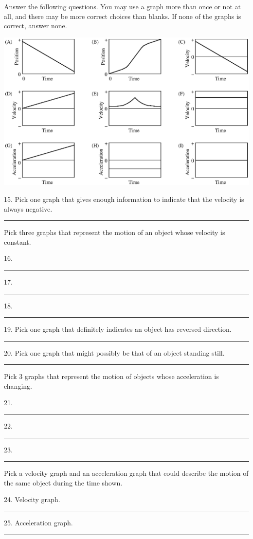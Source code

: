 Answer the following questions. You may use a graph more than once or not at
all, and there may be more correct choices than blanks. If none of the graphs
is correct, answer none.

\vspace{0.3cm}
{\par\centering \includegraphics[trim={0.2cm 0 0.2cm 0},clip,width=\textwidth]{slowing/slowing_fig17.eps} \par}
\vspace{0.3cm}

15. Pick one graph that gives enough information to indicate that the velocity
is always negative. \rule{0.5in}{0.1pt}

Pick three graphs that represent the motion of an object whose velocity is constant.

16. \rule{0.5in}{0.1pt} 17. \rule{0.5in}{0.1pt} 18. \rule{0.5in}{0.1pt}

19. Pick one graph that definitely indicates an object has reversed direction.
\rule{0.5in}{0.1pt}

20. Pick one graph that might possibly be that of an object standing still.
\rule{0.5in}{0.1pt}

Pick 3 graphs that represent the motion of objects whose acceleration is changing.

21. \rule{0.5in}{0.1pt} 22. \rule{0.5in}{0.1pt} 23. \rule{0.5in}{0.1pt}

Pick a velocity graph and an acceleration graph that could describe the motion
of the same object during the time shown.

24. Velocity graph. \rule{0.5in}{0.1pt} 25. Acceleration graph. \rule{0.5in}{0.1pt}

